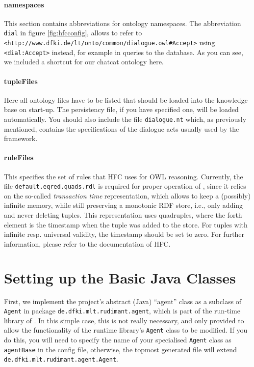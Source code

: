 \paragraph{namespaces}

This section contains abbreviations for ontology namespaces. The abbreviation
\texttt{dial} in figure \ref{fig:hfcconfig}, allows to refer to
\texttt{<http://www.dfki.de/lt/onto/common/dialogue.owl\#Accept>} using
\texttt{<dial:Accept>} instead, for example in queries to the database. As
you can see, we included a shortcut for our chatcat ontology here.

\paragraph{tupleFiles}

Here all ontology files have to be listed that should be loaded into the
knowledge base on start-up. The persistency file, if you have specified one,
will be loaded automatically. You should also include the file
\texttt{dialogue.nt} which, as previously mentioned, contains the
specifications of the dialogue acts usually used by the \vonda framework.

\paragraph{ruleFiles}

This specifies the set of rules that HFC uses for OWL reasoning. Currently, the
file \texttt{default.eqred.quads.rdl} is required for proper operation of
\vonda, since it relies on the so-called \emph{transaction time}
representation, which allows to keep a (possibly) infinite memory, while still
preserving a monotonic RDF store, i.e., only adding and never deleting
tuples. This representation uses quadruples, where the forth element is the
timestamp when the tuple was added to the store. For tuples with infinite
resp. universal validity, the timestamp should be set to zero. For further
information, please refer to the documentation of HFC.

\section{Setting up the Basic Java Classes}

First, we implement the project's abstract (Java) ``agent'' class as a
subclass of \texttt{Agent} in package
\texttt{de.dfki.mlt.rudimant.agent}, which is part of the run-time library
of \vonda. In this simple case, this is not really necessary, and only
provided to allow the functionality of the runtime library's \texttt{Agent}
class to be modified. If you do this, you will need to specify the
name of your specialised \texttt{Agent} class as
\texttt{agentBase} in the config file, otherwise, the topmost
generated file will extend \texttt{de.dfki.mlt.rudimant.agent.Agent}.

